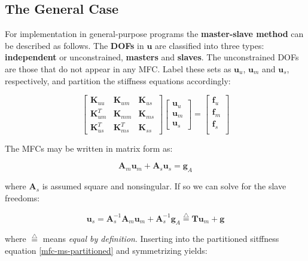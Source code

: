 \documentclass[10pt,b5paper,titlepage]{book}
\newcommand{\m}{\mathbf}
\newcommand*\eqd{\stackrel{\triangle}{=}}
\begin{document}
\subsection{The General Case}

For implementation in general-purpose programs the \textbf{master-slave method}
can be described as follows. The \textbf{DOFs} in $ \m{u} $ are classified
into three types: \textbf{independent} or unconstrained, \textbf{masters} and
\textbf{slaves}. The unconstrained DOFs are those that do not appear in any MFC.
Label these sets as $ \m{u}_u $, $ \m{u}_m $ and $ \m{u}_s $,
respectively, and partition the stiffness equations accordingly:

\begin{equation}\label{mfc-ms-partitioned}
    \begin{bmatrix}
        \m{K}_{uu} & \m{K}_{um} & \m{K}_{us} \\
        \m{K}_{um}^T & \m{K}_{mm} & \m{K}_{ms} \\
        \m{K}_{us}^T & \m{K}_{ms}^T & \m{K}_{ss}
    \end{bmatrix}
    \begin{bmatrix}
        \m{u}_u \\
        \m{u}_m \\
        \m{u}_s
    \end{bmatrix}
    = \begin{bmatrix}
        \m{f}_u \\
        \m{f}_m \\
        \m{f}_s \\
    \end{bmatrix}
\end{equation}

The MFCs may be written in matrix form as:

\begin{equation}
    \m{A}_m \m{u}_m + \m{A}_s \m{u}_s = \m{g}_A
\end{equation}

where $ \m{A}_s $ is assumed square and nonsingular. If so we can solve for
the slave freedoms:

\begin{equation}
    \m{u}_s = \m{A}_s^{-1} \m{A}_m \m{u}_m
    + \m{A}_s^{-1} \m{g}_A
    \eqd \m{T} \m{u}_m + \m{g}
\end{equation}

where $ \eqd $ means \textit{equal by definition}. Inserting into the partitioned
sitffness equation \eqref{mfc-ms-partitioned} and symmetrizing yields:
\end{document}
